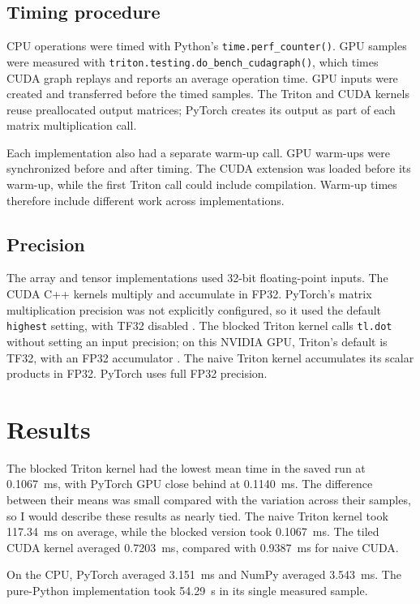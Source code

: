 \documentclass[11pt,letterpaper]{article}
\begin{document}
\subsection{Timing procedure}
CPU operations were timed with Python's \texttt{time.perf\_counter()}. GPU samples were measured with \texttt{triton.testing.do\_bench\_cudagraph()}, which times CUDA graph replays and reports an average operation time. GPU inputs were created and transferred before the timed samples. The Triton and CUDA kernels reuse preallocated output matrices; PyTorch creates its output as part of each matrix multiplication call.

Each implementation also had a separate warm-up call. GPU warm-ups were synchronized before and after timing. The CUDA extension was loaded before its warm-up, while the first Triton call could include compilation. Warm-up times therefore include different work across implementations.

\subsection{Precision}
The array and tensor implementations used 32-bit floating-point inputs. The CUDA C++ kernels multiply and accumulate in FP32. PyTorch's matrix multiplication precision was not explicitly configured, so it used the default \texttt{highest} setting, with TF32 disabled \cite{pytorch}. The blocked Triton kernel calls \texttt{tl.dot} without setting an input precision; on this NVIDIA GPU, Triton's default is TF32, with an FP32 accumulator \cite{triton}. The naive Triton kernel accumulates its scalar products in FP32. PyTorch uses full FP32 precision.

\section{Results}
The blocked Triton kernel had the lowest mean time in the saved run at 0.1067~ms, with PyTorch GPU close behind at 0.1140~ms. The difference between their means was small compared with the variation across their samples, so I would describe these results as nearly tied. The naive Triton kernel took 117.34~ms on average, while the blocked version took 0.1067~ms. The tiled CUDA kernel averaged 0.7203~ms, compared with 0.9387~ms for naive CUDA.

On the CPU, PyTorch averaged 3.151~ms and NumPy averaged 3.543~ms. The pure-Python implementation took 54.29~s in its single measured sample.
\end{document}
